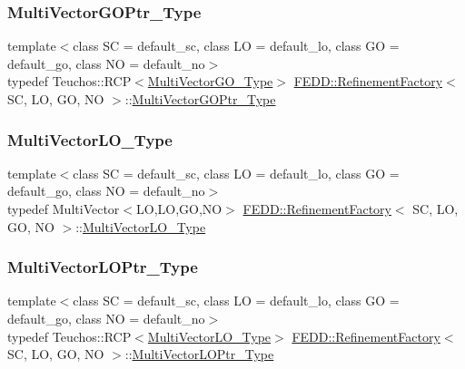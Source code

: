 \subsubsection{\texorpdfstring{Multi\+Vector\+G\+O\+Ptr\+\_\+\+Type}{MultiVectorGOPtr\_Type}}
{\footnotesize\ttfamily template$<$class SC  = default\+\_\+sc, class LO  = default\+\_\+lo, class GO  = default\+\_\+go, class NO  = default\+\_\+no$>$ \\
typedef Teuchos\+::\+R\+CP$<$\hyperlink{classFEDD_1_1RefinementFactory_a433fd79c1903a3771cffbaed6f5dbd71}{Multi\+Vector\+G\+O\+\_\+\+Type}$>$ \hyperlink{classFEDD_1_1RefinementFactory}{F\+E\+D\+D\+::\+Refinement\+Factory}$<$ SC, LO, GO, NO $>$\+::\hyperlink{classFEDD_1_1RefinementFactory_a9e4318c3bc9a63b25f6283955ff80d49}{Multi\+Vector\+G\+O\+Ptr\+\_\+\+Type}}

\mbox{\label{classFEDD_1_1RefinementFactory_ae731f05f6a28d13f917230f914f29037}} 
\subsubsection{\texorpdfstring{Multi\+Vector\+L\+O\+\_\+\+Type}{MultiVectorLO\_Type}}
{\footnotesize\ttfamily template$<$class SC  = default\+\_\+sc, class LO  = default\+\_\+lo, class GO  = default\+\_\+go, class NO  = default\+\_\+no$>$ \\
typedef Multi\+Vector$<$LO,LO,GO,NO$>$ \hyperlink{classFEDD_1_1RefinementFactory}{F\+E\+D\+D\+::\+Refinement\+Factory}$<$ SC, LO, GO, NO $>$\+::\hyperlink{classFEDD_1_1RefinementFactory_ae731f05f6a28d13f917230f914f29037}{Multi\+Vector\+L\+O\+\_\+\+Type}}

\mbox{\label{classFEDD_1_1RefinementFactory_a002c7179ca2f22db4505da2db0f798e9}} 
\subsubsection{\texorpdfstring{Multi\+Vector\+L\+O\+Ptr\+\_\+\+Type}{MultiVectorLOPtr\_Type}}
{\footnotesize\ttfamily template$<$class SC  = default\+\_\+sc, class LO  = default\+\_\+lo, class GO  = default\+\_\+go, class NO  = default\+\_\+no$>$ \\
typedef Teuchos\+::\+R\+CP$<$\hyperlink{classFEDD_1_1RefinementFactory_ae731f05f6a28d13f917230f914f29037}{Multi\+Vector\+L\+O\+\_\+\+Type}$>$ \hyperlink{classFEDD_1_1RefinementFactory}{F\+E\+D\+D\+::\+Refinement\+Factory}$<$ SC, LO, GO, NO $>$\+::\hyperlink{classFEDD_1_1RefinementFactory_a002c7179ca2f22db4505da2db0f798e9}{Multi\+Vector\+L\+O\+Ptr\+\_\+\+Type}}

